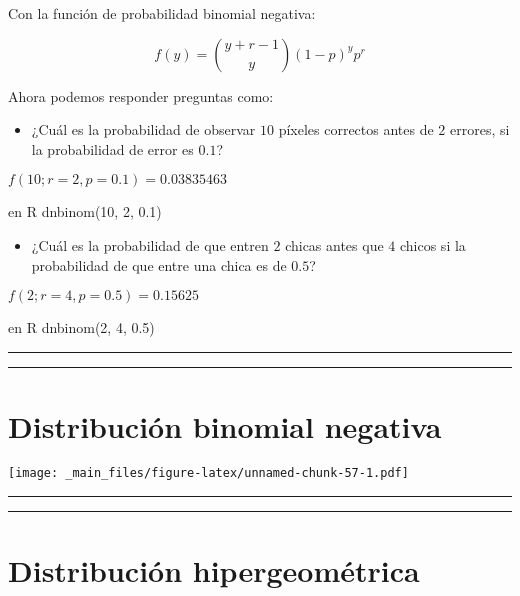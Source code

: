 \documentclass[
]{book}
\providecommand{\tightlist}{%
  \setlength{\itemsep}{0pt}\setlength{\parskip}{0pt}}
\begin{document}
Con la función de probabilidad binomial negativa:

\[f(y)=\binom {y+r-1} y (1-p)^yp^r\]

Ahora podemos responder preguntas como:

\begin{itemize}
\tightlist
\item
  ¿Cuál es la probabilidad de observar \(10\) píxeles correctos antes de \(2\) errores, si la probabilidad de error es \(0.1\)?
\end{itemize}

\(f(10; r=2, p=0.1)=0.03835463\)

en R dnbinom(10, 2, 0.1)

\begin{itemize}
\tightlist
\item
  ¿Cuál es la probabilidad de que entren \(2\) chicas antes que \(4\) chicos si la probabilidad de que entre una chica es de \(0.5\)?
\end{itemize}

\(f(2; r=4, p=0.5)=0.15625\)

en R dnbinom(2, 4, 0.5)

\begin{center}\rule{0.5\linewidth}{0.5pt}\end{center}

\begin{center}\rule{0.5\linewidth}{0.5pt}\end{center}

\hypertarget{distribuciuxf3n-binomial-negativa-3}{%
\section{Distribución binomial negativa}\label{distribuciuxf3n-binomial-negativa-3}}

\texttt{[image: \_main\_files/figure-latex/unnamed-chunk-57-1.pdf]}

\begin{center}\rule{0.5\linewidth}{0.5pt}\end{center}

\begin{center}\rule{0.5\linewidth}{0.5pt}\end{center}

\hypertarget{distribuciuxf3n-hipergeomuxe9trica}{%
\section{Distribución hipergeométrica}\label{distribuciuxf3n-hipergeomuxe9trica}}
\end{document}
